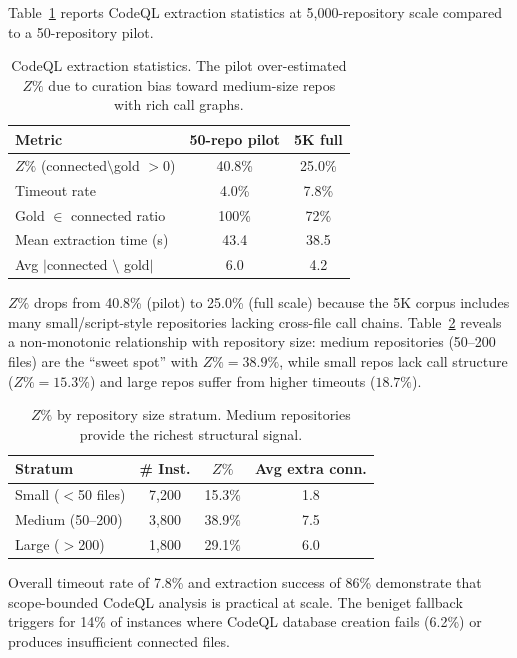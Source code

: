 \documentclass[11pt,a4paper]{article}
\begin{document}
Table~\ref{tab:codeql-scale} reports CodeQL extraction statistics at 5,000-repository scale compared to a 50-repository pilot.

\begin{table}[t]
\centering
\small
\begin{tabular}{lcc}
\toprule
\textbf{Metric} & \textbf{50-repo pilot} & \textbf{5K full} \\
\midrule
$Z\%$ (connected$\setminus$gold $> 0$) & 40.8\% & 25.0\% \\
Timeout rate & 4.0\% & 7.8\% \\
Gold $\in$ connected ratio & 100\% & 72\% \\
Mean extraction time (s) & 43.4 & 38.5 \\
Avg $|$connected $\setminus$ gold$|$ & 6.0 & 4.2 \\
\bottomrule
\end{tabular}
\caption{CodeQL extraction statistics. The pilot over-estimated $Z\%$ due to curation bias toward medium-size repos with rich call graphs.}
\label{tab:codeql-scale}
\end{table}

$Z\%$ drops from 40.8\% (pilot) to 25.0\% (full scale) because the 5K corpus includes many small/script-style repositories lacking cross-file call chains.
Table~\ref{tab:codeql-strata} reveals a non-monotonic relationship with repository size: medium repositories (50--200 files) are the ``sweet spot'' with $Z\%{=}38.9\%$, while small repos lack call structure ($Z\%{=}15.3\%$) and large repos suffer from higher timeouts ($18.7\%$).

\begin{table}[t]
\centering
\small
\begin{tabular}{lccc}
\toprule
\textbf{Stratum} & \textbf{\# Inst.} & \textbf{$Z\%$} & \textbf{Avg extra conn.} \\
\midrule
Small ($<$50 files) & 7,200 & 15.3\% & 1.8 \\
Medium (50--200) & 3,800 & 38.9\% & 7.5 \\
Large ($>$200) & 1,800 & 29.1\% & 6.0 \\
\bottomrule
\end{tabular}
\caption{$Z\%$ by repository size stratum. Medium repositories provide the richest structural signal.}
\label{tab:codeql-strata}
\end{table}

Overall timeout rate of 7.8\% and extraction success of 86\% demonstrate that scope-bounded CodeQL analysis is practical at scale.
The beniget fallback triggers for 14\% of instances where CodeQL database creation fails (6.2\%) or produces insufficient connected files.
\end{document}
